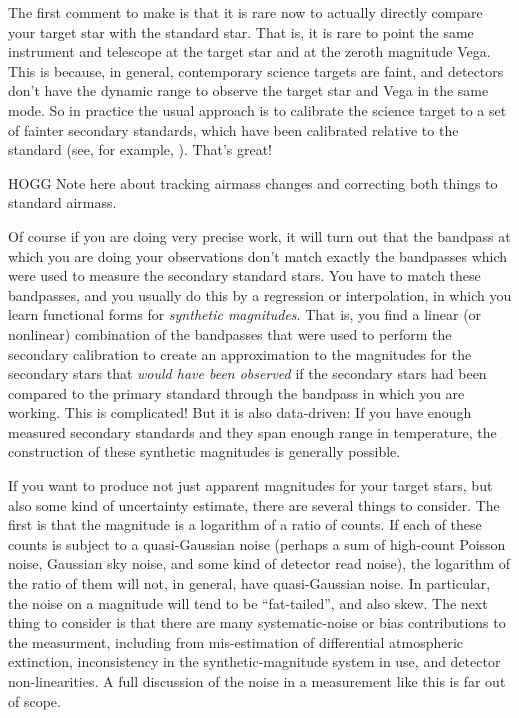 \documentclass[10pt]{article}
\begin{document}
The first comment to make is that it is rare now to actually directly compare your target star with the standard star.
That is, it is rare to point the same instrument and telescope at the target star and at the zeroth magnitude Vega.
This is because, in general, contemporary science targets are faint, and detectors don't have the dynamic range to observe the target star and Vega in the same mode.
So in practice the usual approach is to calibrate the science target to a set of fainter secondary standards, which have been calibrated relative to the standard (see, for example, \cite{landolt}).
That's great!

HOGG Note here about tracking airmass changes and correcting both things to standard airmass.

Of course if you are doing very precise work, it will turn out that the bandpass at which you are doing your observations don't match exactly the bandpasses which were used to measure the secondary standard stars.
You have to match these bandpasses, and you usually do this by a regression or interpolation, in which you learn functional forms for \emph{synthetic magnitudes}.
That is, you find a linear (or nonlinear) combination of the bandpasses that were used to perform the secondary calibration to create an approximation to the magnitudes for the secondary stars that \emph{would have been observed} if the secondary stars had been compared to the primary standard through the bandpass in which you are working.
This is complicated! But it is also data-driven: If you have enough measured secondary standards and they span enough range in temperature, the construction of these synthetic magnitudes is generally possible.

If you want to produce not just apparent magnitudes for your target stars, but also some kind of uncertainty estimate, there are several things to consider.
The first is that the magnitude is a logarithm of a ratio of counts.
If each of these counts is subject to a quasi-Gaussian noise (perhaps a sum of high-count Poisson noise, Gaussian sky noise, and some kind of detector read noise), the logarithm of the ratio of them will not, in general, have quasi-Gaussian noise.
In particular, the noise on a magnitude will tend to be ``fat-tailed'', and also skew.
The next thing to consider is that there are many systematic-noise or bias contributions to the measurment, including from mis-estimation of differential atmospheric extinction, inconsistency in the synthetic-magnitude system in use, and detector non-linearities.
A full discussion of the noise in a measurement like this is far out of scope.
\end{document}
